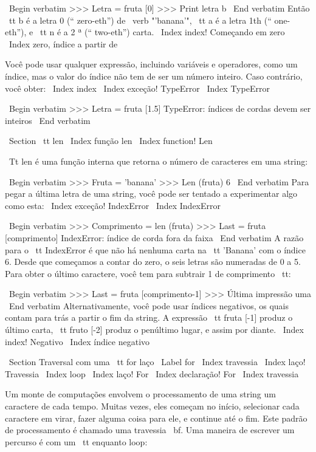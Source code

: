 \documentclass[10pt]{book}
\begin{document}
{{{{\ Begin {verbatim}
>>> Letra = fruta [0]
>>> Print letra
b
\ End {verbatim}
%
Então {\ tt b} é a letra 0 (`` zero-eth'') de \ verb "'banana'", {\ tt a}
é a letra 1th (`` one-eth''), e {\ tt n} é a 2 ª (`` two-eth'')
carta.
\ Index {index! Começando em zero}
\ Index {zero, índice a partir de}

Você pode usar qualquer expressão, incluindo variáveis ​​e operadores, como um
índice, mas o valor do índice não tem de ser um número inteiro. Caso contrário, você
obter:
\ Index {index}
\ Index {exceção! TypeError}
\ Index {} TypeError

\ Begin {verbatim}
>>> Letra = fruta [1.5]
TypeError: índices de cordas devem ser inteiros
\ End {verbatim}
%

\ Section {{\ tt len}}
\ Index {função len}
\ Index {function! Len}

{\ Tt len} é uma função interna que retorna o número de caracteres
em uma string:

\ Begin {verbatim}
>>> Fruta = 'banana'
>>> Len (fruta)
6
\ End {verbatim}
%
Para pegar a última letra de uma string, você pode ser tentado a experimentar algo
como esta:
\ Index {exceção! IndexError}
\ Index {} IndexError

\ Begin {verbatim}
>>> Comprimento = len (fruta)
>>> Last = fruta [comprimento]
IndexError: índice de corda fora da faixa
\ End {verbatim}
%
A razão para o {\ tt IndexError} é que não há nenhuma carta na {\ tt
'Banana'} com o índice 6. Desde que começamos a contar do zero, o
seis letras são numeradas de 0 a 5. Para obter o último caractere, você tem
para subtrair 1 de comprimento {\ tt}:

\ Begin {verbatim}
>>> Last = fruta [comprimento-1]
>>> Última impressão
uma
\ End {verbatim}
%
Alternativamente, você pode usar índices negativos, os quais contam para trás a partir
o fim da string. A expressão {\ tt fruta [-1]} produz o último
carta, {\ tt fruto [-2]} produz o penúltimo lugar, e assim por diante.
\ Index {index! Negativo}
\ Index {índice negativo}


\ Section {Traversal com uma {\ tt for}} laço
\ Label {for}
\ Index {travessia}
\ Index {laço! Travessia}
\ Index {loop}
\ Index {laço! For}
\ Index {declaração! For}
\ Index {travessia}

Um monte de computações envolvem o processamento de uma string um caractere de cada
tempo. Muitas vezes, eles começam no início, selecionar cada caractere em
virar, fazer alguma coisa para ele, e continue até o fim. Este padrão de
processamento é chamado uma travessia {\ bf}. Uma maneira de escrever um percurso
é com um {\ tt enquanto} loop:

}}}}
\end{document}
